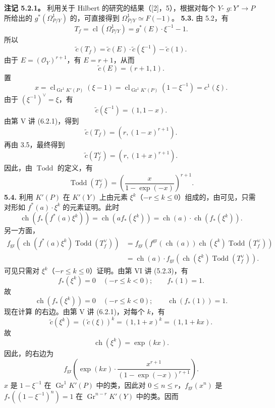 \textbf{注记 5.2.1。} 利用关于 Hilbert 的研究的结果（[2]，5），根据对每个 $Y$- $g:Y'\to P$ 所给出的 $g^*(\Omega^1_{P/Y})$ 的，可直接得到 $\Omega^1_{P/Y}\simeq F(-1)$。
\textbf{5.3.} 由 5.2，有
\[T_f=\operatorname{cl}(\Omega^1_{P/Y})=g^*(E)\cdot\xi^{-1}-1.\]
所以
\[\widetilde c(T_f)=\widetilde c(E)\cdot\widetilde c(\xi^{-1})-\widetilde c(1).\]
由于 $E=(\mathscr O_Y)^{r+1}$，有 $E=r+1$，从而
\[\widetilde c(E)=(r+1,1).\]
置
\[x=\operatorname{cl}_{\operatorname{Gr}^1K'(P)}(\xi-1)=\operatorname{cl}_{\operatorname{Gr}^1K'(P)}(1-\xi^{-1})=c^1(\xi).\]
由于 $(\xi^{-1})^\vee=\xi$，有
\[\widetilde c(\xi^{-1})=(1,1-x).\]
由第 V 讲 (6.2.1)，得到
\[\widetilde c(T_f)=(r,(1-x)^{r+1}).\]
再由 3.5，最终得到
\[\widetilde c(T_f^\vee)=(r,(1+x)^{r+1}).\]
因此，由 $\operatorname{Todd}$ 的定义，有
\[\operatorname{Todd}(T_f^\vee)=\left(\frac{x}{1-\exp(-x)}\right)^{r+1}.\tag{5.3.1}\]
\textbf{5.4.} 利用 $K'(P)$ 在 $K'(Y)$ 上由元素 $\xi^k$（$-r\leq k\leq0$）组成的，由可见，只需对形如 $f^*(a)\cdot\xi^k$ 的元素证明。此时
\[\operatorname{ch}(f_*(f^*(a)\xi^k))=\operatorname{ch}(a f_*(\xi^k))=\operatorname{ch}(a)\cdot\operatorname{ch}(f_*(\xi^k)).\]
另一方面，
\[\begin{aligned}
f_{\mathrm{gr}}(\operatorname{ch}(f^*(a)\xi^k)\operatorname{Todd}(T_f^\vee))
&=f_{\mathrm{gr}}(f^{\mathrm{gr}}(\operatorname{ch}(a))\operatorname{ch}(\xi^k)\operatorname{Todd}(T_f^\vee))\\
&=\operatorname{ch}(a)\cdot f_{\mathrm{gr}}(\operatorname{ch}(\xi^k)\operatorname{Todd}(T_f^\vee)).
\end{aligned}\]
可见只需对 $\xi^k$（$-r\leq k\leq0$）证明。由第 VI 讲 (5.2.3)，有
\[f_*(\xi^k)=0\quad(-r\leq k<0);\qquad f_*(1)=1.\]
故
\[\operatorname{ch}(f_*(\xi^k))=0\quad(-r\leq k<0);\qquad\operatorname{ch}(f_*(1))=1.\tag{5.4.1}\]
现在计算 的右边。由第 V 讲 (6.2.1)，对每个 $k$，有
\[\widetilde c(\xi^k)=(\widetilde c(\xi))^k=(1,1+x)^k=(1,1+kx).\]
故
\[\operatorname{ch}(\xi^k)=\exp(kx).\tag{5.4.2}\]
因此，的右边为
\[f_{\mathrm{gr}}\left(\exp(kx)\cdot\frac{x^{r+1}}{(1-\exp(-x))^{r+1}}\right).\tag{5.4.3}\]
$x$ 是 $1-\xi^{-1}$ 在 $\operatorname{Gr}^1K'(P)$ 中的类，因此对 $0\leq n\leq r$，$f_{\mathrm{gr}}(x^n)$ 是 $f_*((1-\xi^{-1})^n)=1$ 在 $\operatorname{Gr}^{n-r}K'(Y)$ 中的类。因而

